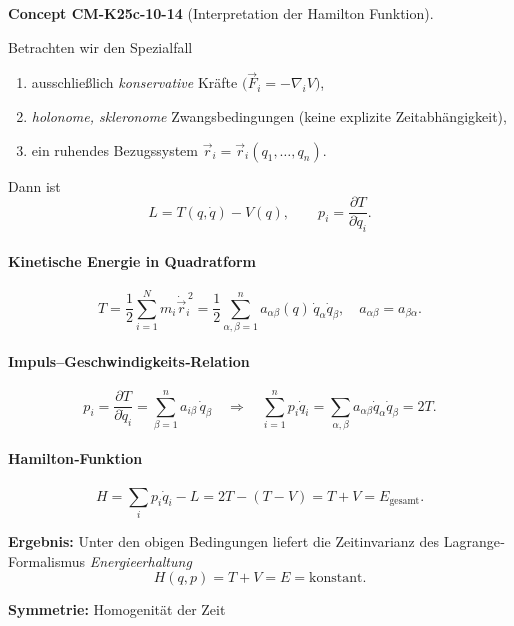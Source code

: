 \documentclass[10pt, letterpaper]{article}
\newcommand{\CustomHeading}[3]{%
  \par\medskip\noindent%
  \textbf{#1 #2} \textnormal{(#3)}.\enskip%
}
\newenvironment{CONC}[2]{\begin{unitbox}\CustomHeading{Concept}{#1}{#2}}{\end{unitbox}}
\begin{document}
\begin{CONC}{CM-K25c-10-14}{Interpretation der Hamilton Funktion}
Betrachten wir den Spezialfall

\begin{enumerate}[label=(\roman*), leftmargin=*]
\item ausschließlich \emph{konservative} Kräfte
      \(\bigl(\vec F_i=-\nabla_i V\bigr)\),
\item \emph{holonome, skleronome} Zwangsbedingungen
      (keine explizite Zeitabhängigkeit),
\item ein ruhendes Bezugssystem
      \(\vec r_i=\vec r_i(q_1,\dots,q_n)\).
\end{enumerate}

Dann ist
\[
  L=T(q,\dot q)-V(q),
  \qquad
  p_i=\frac{\partial T}{\partial\dot q_i}.
\]

\paragraph{Kinetische Energie in Quadratform}

\[
  T
  =\frac{1}{2}\sum_{i=1}^{N}m_i\dot{\vec r}_i^{\,2}
  =\frac{1}{2}\sum_{\alpha,\beta=1}^{n}
      a_{\alpha\beta}(q)\,\dot q_\alpha\dot q_\beta,
\quad
  a_{\alpha\beta}=a_{\beta\alpha}.
\]

\paragraph{Impuls–Geschwindigkeits‐Relation}

\[
  p_i
  =\frac{\partial T}{\partial\dot q_i}
  =\sum_{\beta=1}^{n} a_{i\beta}\,\dot q_\beta
  \quad\Longrightarrow\quad
  \sum_{i=1}^{n}p_i\dot q_i
  =\sum_{\alpha,\beta}a_{\alpha\beta}\dot q_\alpha\dot q_\beta
  =2T.
\]

\paragraph{Hamilton‐Funktion}

\[
  H
  =\sum_{i}p_i\dot q_i - L
  =2T-(T-V)=T+V
  =E_{\text{gesamt}}.
\]

\noindent
\textbf{Ergebnis:}  
Unter den obigen Bedingungen liefert die Zeitinvarianz des
Lagrange‐Formalismus \emph{Energieerhaltung}
\[
  \boxed{\;
    H(q,p)=T+V=E=\text{konstant}.
  \;}
\]
\end{CONC}





\textbf{Symmetrie:} Homogenität der Zeit\\
\end{document}
